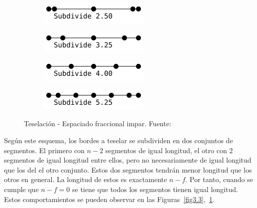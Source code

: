 \begin{figure}
	\centering
	\begin{subfigure}{.45\textwidth}
			\includegraphics[width=\textwidth]{figures/odd1.png}	
	\end{subfigure}
	\hfill
	\begin{subfigure}{.45\textwidth}
			\includegraphics[width=\textwidth]{figures/odd2.png}	
	\end{subfigure}
	\newline
	\begin{subfigure}{.45\textwidth}
			\includegraphics[width=\textwidth]{figures/odd3.png}	
	\end{subfigure}
	\hfill
	\begin{subfigure}{.45\textwidth}
			\includegraphics[width=\textwidth]{figures/odd4.png}	
	\end{subfigure}
	\caption[Teselación - Espaciado fraccional impar.]{Teselación - Espaciado
	fraccional impar. Fuente:~\cite{TessellationImages}}
	\label{fig3.4}
\end{figure}

Según este esquema, los bordes a teselar se subdividen en dos conjuntos de
segmentos. El primero con $n-2$ segmentos de igual longitud, el otro con $2$
segmentos de igual longitud entre ellos, pero no necesariamente de igual
longitud que los del el otro conjunto. Estos dos segmentos tendrán menor
longitud que los otros en general. La longitud de estos es exactamente $n-f$.
Por tanto, cuando se cumple que $n-f=0$ se tiene que todos los segmentos tienen
igual longitud. Estos comportamientos se pueden observar en las
Figuras~\ref{fig3.3},~\ref{fig3.4}.

